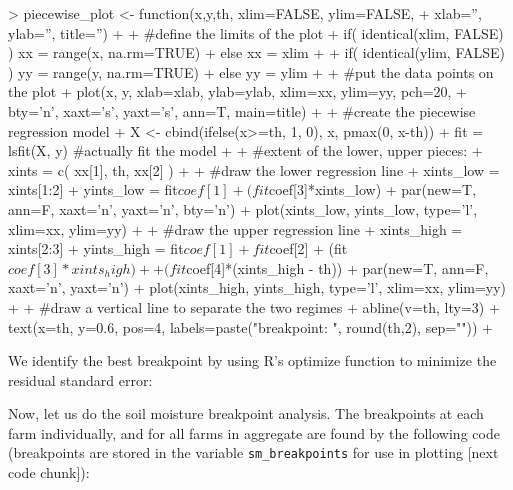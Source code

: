 \documentclass[12pt]{article}
\begin{document}
\begin{Schunk}
\begin{Sinput}
> piecewise_plot <- function(x,y,th, xlim=FALSE, ylim=FALSE,
+                               xlab='', ylab='', title='')
+ {
+     #define the limits of the plot
+     if( identical(xlim, FALSE) ) { xx = range(x, na.rm=TRUE) }
+     else { xx = xlim }
+ 
+     if( identical(ylim, FALSE) ) { yy = range(y, na.rm=TRUE) }
+     else { yy = ylim }
+     
+     #put the data points on the plot
+     plot(x, y, xlab=xlab, ylab=ylab, xlim=xx, ylim=yy, pch=20,
+            bty='n', xaxt='s', yaxt='s', ann=T, main=title) 
+ 
+     #create the piecewise regression model
+     X <- cbind(ifelse(x>=th, 1, 0), x, pmax(0, x-th))
+     fit = lsfit(X, y) #actually fit the model
+     
+     #extent of the lower, upper pieces:
+     xints = c( xx[1], th, xx[2] )
+ 
+     #draw the lower regression line
+     xints_low = xints[1:2]
+     yints_low = fit$coef[1] + (fit$coef[3]*xints_low)
+     par(new=T, ann=F, xaxt='n', yaxt='n', bty='n')
+     plot(xints_low, yints_low, type='l', xlim=xx, ylim=yy)
+     
+     #draw the upper regression line
+     xints_high = xints[2:3]
+     yints_high = fit$coef[1] + fit$coef[2] + (fit$coef[3]*xints_high) +
+                     (fit$coef[4]*(xints_high - th))
+     par(new=T, ann=F, xaxt='n', yaxt='n')
+     plot(xints_high, yints_high, type='l', xlim=xx, ylim=yy) 
+     
+     #draw a vertical line to separate the two regimes
+     abline(v=th, lty=3) 
+     text(x=th, y=0.6, pos=4, labels=paste("breakpoint: ", round(th,2), sep=""))
+ }
\end{Sinput}
\end{Schunk}

\newpage
We identify the best breakpoint by using R's optimize function to minimize the residual standard error:

\begin{Schunk}
\end{Schunk}



\vspace{5mm}
Now, let us do the soil moisture breakpoint analysis. The breakpoints at each farm individually, and for all farms in aggregate are found by the following code (breakpoints are stored in the variable \verb+sm_breakpoints+ for use in plotting [next code chunk]):\\
\end{document}
